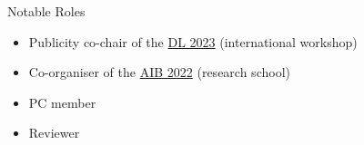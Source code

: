 \begin{rSection}{Notable Roles}
    \begin{itemize}
        \item Publicity co-chair of the \href{https://dl2023.w.uib.no/}{DL 2023} (international workshop)
        \item Co-organiser of the \href{https://researchschool.w.uib.no/}{AIB 2022} (research school) 
        \item PC member
        \item Reviewer
    \end{itemize} 
\end{rSection}
